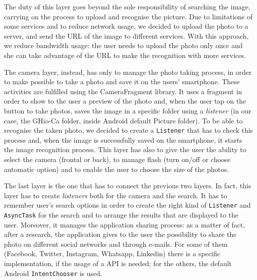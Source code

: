 The duty of this layer goes beyond the sole responsibility of searching the 
image, carrying on the process to upload and recognise the picture.
Due to limitations of some services and to reduce network usage, we decided 
to upload the photo to a server, and send the URL of the image to different 
services.
With this approach, we reduce bandwidth usage: the user needs to upload the
photo only once and she can take advantage of the URL to make the recognition 
with more services.

The camera layer, instead, has only to manage the photo taking process, in order
to make possible to take a photo and save it on the users' smartphone. These
activities are fulfilled using the CameraFragment library. It uses a fragment
in order to show to the user a preview of the photo and, when the user tap on
the button to take photos, saves the image in a specific folder using a
\textit{listener} (in our case, the GHio-Ca folder, inside Android default Picture
folder). To be able to recognise the taken photo, we decided to create a
\texttt{Listener} that has to check this process and, when the image is 
successfully saved on the smartphone, it starts the image recognition process.
This layer has also to give the user the ability to select the camera (frontal
or back), to manage flash (turn on/off or choose automatic option) and to enable
the user to choose the size of the photos.

The last layer is the one that has to connect the previous two layers. In fact,
this layer has to create \textit{listeners} both for the camera and the search. It has
to remember user's search options in order to create the right kind of
\texttt{Listener} and \texttt{AsyncTask} for the search and to arrange the 
results that are displayed to the user. Moreover, it manages the application
sharing process: as a matter of fact, after a research, the application gives 
to the user the possibility to share the photo on different social networks and
through e-mails. For some of them (Facebook, Twitter, Instagram, Whatsapp,
Linkedin) there is a specific implementation, if the usage of a API is needed;
for the others, the default Android \texttt{IntentChooser} is used.
